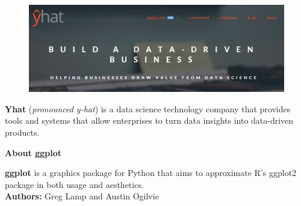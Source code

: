 \documentclass{beamer}
\begin{document}
\begin{frame}
	
\begin{figure}
\centering
\includegraphics[width=0.8\linewidth]{yhat}
\end{figure}
\Large
\textbf{Yhat} (\textit{pronounced y-hat}) is a data science technology company that provides tools and systems that allow enterprises to turn data insights into data-driven products.\\ \bigskip


\end{frame}

\begin{frame}
	\Large
	\noindent\textbf{About ggplot}

	
\textbf{ggplot} is a graphics package for Python that aims to approximate R's ggplot2 package in both usage and aesthetics.\\
\bigskip
\textbf{Authors:} Greg Lamp and Austin Ogilvie
\end{frame}
\end{document}
